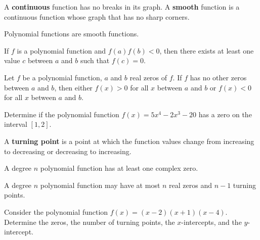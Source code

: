 \begin{definition}
  A \textbf{continuous} function has no breaks in its graph. A \textbf{smooth} function is a continuous function whose graph that has no sharp corners.
\end{definition}
\begin{note}
  Polynomial functions are smooth functions.
\end{note}

\begin{theorem}
If $f$ is a polynomial function and $f(a)f(b)<0$, then there exists at least one value $c$ between $a$ and $b$ such that $f(c)=0$.
\end{theorem}

\begin{corollary}
  Let $f$ be a polynomial function, $a$ and $b$ real zeros of $f$. If $f$ has no other zeros between $a$ and $b$, then either $f(x)>0$ for all $x$ between $a$ and $b$ or $f(x)<0$ for all $x$ between $a$ and $b$.
\end{corollary}

\newpage

\begin{example}
  Determine if the polynomial function $f(x)=5x^4-2x^3-20$ has a zero on the interval $[1, 2]$.
\end{example}

\begin{definition}
  A \textbf{turning point} is a point at which the function values change from increasing to decreasing or decreasing to increasing.
\end{definition}

\begin{theorem}
  A degree $n$ polynomial function has at least one complex zero.
\end{theorem}

\begin{proposition}
  A degree $n$ polynomial function may have at most $n$ real zeros and $n-1$ turning points.
\end{proposition}

\newpage

\begin{example}
  Consider the polynomial function  $f(x)=(x-2)(x+1)(x-4)$. Determine the zeros, the number of turning points, the $x$-intercepts, and the $y$-intercept.
\end{example}

\newpage

